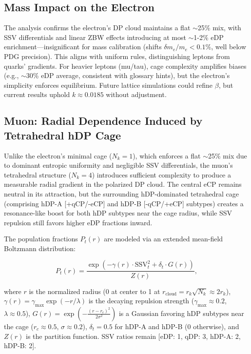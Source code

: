 \documentclass{article}
\begin{document}
\subsection{Mass Impact on the Electron}
The analysis confirms the electron's DP cloud maintains a flat $\sim$25\% mix, with SSV differentials and linear ZBW effects introducing at most $\sim$1-2\% eDP enrichment—insignificant for mass calibration (shifts $\delta m_e / m_e < 0.1\%$, well below PDG precision). This aligns with uniform rules, distinguishing leptons from quarks' gradients. For heavier leptons (mu/tau), cage complexity amplifies biases (e.g., $\sim$30\% eDP average, consistent with glossary hints), but the electron's simplicity enforces equilibrium. Future lattice simulations could refine $\beta$, but current results uphold $k \approx 0.0185$ without adjustment.

\subsection{Muon: Radial Dependence Induced by Tetrahedral hDP Cage}

Unlike the electron's minimal cage ($N_k = 1$), which enforces a flat $\sim$25\% mix due to dominant entropic uniformity and negligible SSV differentials, the muon's tetrahedral structure ($N_k = 4$) introduces sufficient complexity to produce a measurable radial gradient in the polarized DP cloud. The central eCP remains neutral in its attraction, but the surrounding hDP-dominated tetrahedral cage (comprising hDP-A [+qCP/-eCP] and hDP-B [-qCP/+eCP] subtypes) creates a resonance-like boost for both hDP subtypes near the cage radius, while SSV repulsion still favors higher eDP fractions inward.

The population fractions $P_t(r)$ are modeled via an extended mean-field Boltzmann distribution:

\begin{equation}
P_t(r) = \frac{\exp\left( -\gamma(r) \cdot \text{SSV}_t^2 + \delta_t \cdot G(r) \right)}{Z(r)},
\end{equation}

where $r$ is the normalized radius (0 at center to 1 at $r_{\text{cloud}} = r_k \sqrt{N_k} \approx 2 r_k$), $\gamma(r) = \gamma_{\max} \exp(-r / \lambda)$ is the decaying repulsion strength ($\gamma_{\max} \approx 0.2$, $\lambda \approx 0.5$), $G(r) = \exp\left( -\frac{(r - r_c)^2}{2 \sigma^2} \right)$ is a Gaussian favoring hDP subtypes near the cage ($r_c \approx 0.5$, $\sigma \approx 0.2$), $\delta_t = 0.5$ for hDP-A and hDP-B (0 otherwise), and $Z(r)$ is the partition function. SSV ratios remain [eDP: 1, qDP: 3, hDP-A: 2, hDP-B: 2].
\end{document}
